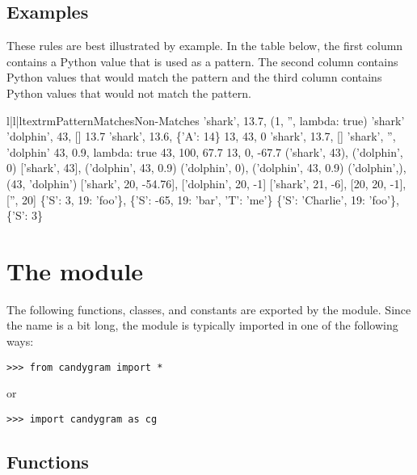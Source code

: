\documentclass{howto}
\newcommand{\lessthan}[0]{\begin{math}<\end{math}}
\newcommand{\greaterthan}[0]{\begin{math}>\end{math}}
\newcommand{\lessthan}[0]{<}
\newcommand{\greaterthan}[0]{>}
\begin{document}
\subsection{Examples}
These rules are best illustrated by example. In the table below, the first
column contains a Python value that is used as a pattern. The second column
contains Python values that would match the pattern and the third column
contains Python values that would not match the pattern.
\begin{tableiii}{l|l|l}{textrm}{Pattern}{Matches}{Non-Matches}
	{'shark', 13.7, (1, '', lambda: true)}
	{}
	{'shark'}
	{'dolphin', 43, []}
	{13.7}
	{'shark', 13.6, \{'A': 14\}}
	{13, 43, 0}
	{'shark', 13.7, []}
	{'shark', '', 'dolphin'}
	{43, 0.9, lambda: true}
\lineiii{lambda x: x \greaterthan\ 20}
	{43, 100, 67.7}
	{13, 0, -67.7}
	{('shark', 43), ('dolphin', 0)}
	{['shark', 43], ('dolphin', 43, 0.9)}
	{('dolphin', 0), ('dolphin', 43, 0.9)}
	{('dolphin',), (43, 'dolphin')}
\lineiii{[str, 20, lambda x: x \lessthan\ 0]}
	{['shark', 20, -54.76], ['dolphin', 20, -1]}
	{['shark', 21, -6], [20, 20, -1], ['', 20]}
	{\{'S': 3, 19: 'foo'\}, \{'S': -65, 19: 'bar', 'T': 'me'\}}
	{\{'S': 'Charlie', 19: 'foo'\}, \{'S': 3\}}
\end{tableiii}



\section{The  module}


The following functions, classes, and constants are exported by the
 module. Since the name  is a bit long, the
module is typically imported in one of the following ways:
\begin{verbatim}
>>> from candygram import *
\end{verbatim}
or
\begin{verbatim}
>>> import candygram as cg
\end{verbatim}


\subsection{Functions}
\end{document}
